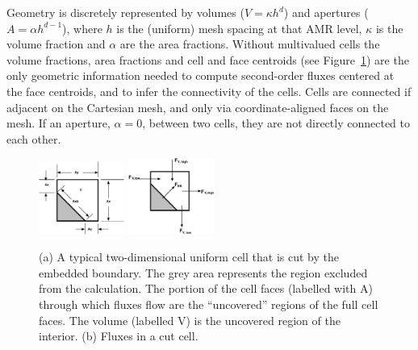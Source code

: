 Geometry is discretely represented by volumes ($V = \kappa h^d$) and apertures 
($A= \alpha h^{d-1}$), where $h$ is the (uniform) mesh spacing at that AMR level,
$\kappa$ is the volume fraction and $\alpha$ are the area fractions.
Without multivalued cells the volume fractions, area fractions and cell and face centroids 
(see Figure~\ref{fig::volume}) are the only geometric information needed to 
compute second-order fluxes centered at the face centroids,  
and to infer the connectivity of the cells.  
Cells are connected if adjacent on the Cartesian mesh, and only via
coordinate-aligned faces on the mesh.  If an aperture, $\alpha = 0$, between two
cells, they are not directly connected to each other.

\begin{figure}[h]
  \centering
  \includegraphics[width=0.25\textwidth]{./EB/areas_and_volumes.pdf}
  \hspace{1in} \includegraphics[width=0.25\textwidth]{./EB/eb_fluxes.pdf}
  \caption{\label{fig::volume} (a) A typical two-dimensional uniform cell that is cut by the embedded
    boundary. The grey area represents the region excluded from the calculation.   The
    portion of the cell faces (labelled with A) through which fluxes flow are the ``uncovered''
    regions of the full cell faces.  The volume (labelled V) is the uncovered
    region of the interior. (b) Fluxes in a cut cell.}
\end{figure}


